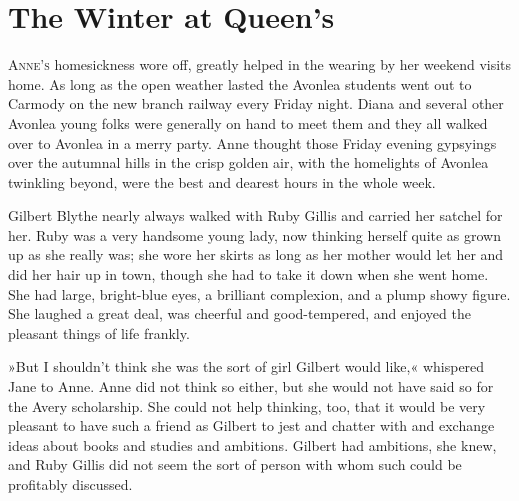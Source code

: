 \chapter{The Winter at Queen's}

\lettrine[lines=4]{A}{nne's} homesickness wore off, greatly helped in the wearing by her weekend visits home. As long as the open weather lasted the Avonlea students went out to Carmody on the new branch railway every Friday night. Diana and several other Avonlea young folks were generally on hand to meet them and they all walked over to Avonlea in a merry party. Anne thought those Friday evening gypsyings over the autumnal hills in the crisp golden air, with the homelights of Avonlea twinkling beyond, were the best and dearest hours in the whole week.

Gilbert Blythe nearly always walked with Ruby Gillis and carried her satchel for her. Ruby was a very handsome young lady, now thinking herself quite as grown up as she really was; she wore her skirts as long as her mother would let her and did her hair up in town, though she had to take it down when she went home. She had large, bright-blue eyes, a brilliant complexion, and a plump showy figure. She laughed a great deal, was cheerful and good-tempered, and enjoyed the pleasant things of life frankly.

»But I shouldn't think she was the sort of girl Gilbert would like,« whispered Jane to Anne. Anne did not think so either, but she would not have said so for the Avery scholarship. She could not help thinking, too, that it would be very pleasant to have such a friend as Gilbert to jest and chatter with and exchange ideas about books and studies and ambitions. Gilbert had ambitions, she knew, and Ruby Gillis did not seem the sort of person with whom such could be profitably discussed.


